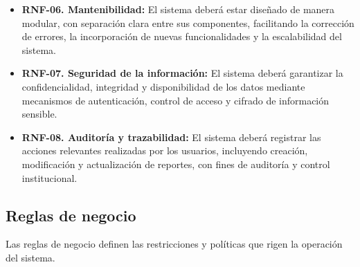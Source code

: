 \begin{itemize}
\item \textbf{RNF-06. Mantenibilidad:}  
El sistema deberá estar diseñado de manera modular, con separación clara entre sus componentes, facilitando la corrección de errores, la incorporación de nuevas funcionalidades y la escalabilidad del sistema.

\item \textbf{RNF-07. Seguridad de la información:}  
El sistema deberá garantizar la confidencialidad, integridad y disponibilidad de los datos mediante mecanismos de autenticación, control de acceso y cifrado de información sensible.

\item \textbf{RNF-08. Auditoría y trazabilidad:}  
El sistema deberá registrar las acciones relevantes realizadas por los usuarios, incluyendo creación, modificación y actualización de reportes, con fines de auditoría y control institucional.


\end{itemize}

\subsection{Reglas de negocio}
\label{subsection:reglas_negocio}

Las reglas de negocio definen las restricciones y políticas que rigen la operación del sistema. 

